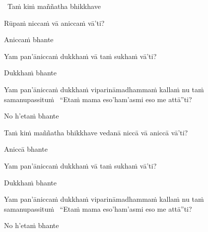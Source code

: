 \begin{pali-leader}
  \anglebracketleft\ \hspace{-0.5mm}Taṁ kiṁ maññatha bhikkhave \hspace{-0.5mm}\anglebracketright\
\end{pali-leader}
\begin{pali-hangtogether}
  Rūpaṁ niccaṁ vā aniccaṁ vā'ti?
\end{pali-hangtogether}
\begin{pali-hangtogether}
  Aniccaṁ bhante
\end{pali-hangtogether}
\begin{pali-hangtogether}
  Yam pan'āniccaṁ dukkhaṁ vā taṁ sukhaṁ vā'ti?
\end{pali-hangtogether}
\begin{pali-hangtogether}
  Dukkhaṁ bhante
\end{pali-hangtogether}
\begin{pali-hangtogether}
  Yam pan'āniccaṁ dukkhaṁ viparināmadhammaṁ kallaṁ nu taṁ samanupassituṁ \breathmark\ ``Etaṁ mama eso'ham'asmi eso me attā''ti?
\end{pali-hangtogether}
\begin{pali-hangtogether}
  No h'etaṁ bhante
\end{pali-hangtogether}

\begin{pali-hang}
  Taṁ kiṁ maññatha bhikkhave vedanā niccā vā aniccā vā'ti?
\end{pali-hang}
\begin{pali-hangtogether}
  Aniccā bhante
\end{pali-hangtogether}
\begin{pali-hangtogether}
  Yam pan'āniccaṁ dukkhaṁ vā taṁ sukhaṁ vā'ti?
\end{pali-hangtogether}
\begin{pali-hangtogether}
  Dukkhaṁ bhante
\end{pali-hangtogether}
\begin{pali-hangtogether}
  Yam pan'āniccaṁ dukkhaṁ viparināmadhammaṁ kallaṁ nu taṁ samanupassituṁ \breathmark\ ``Etaṁ mama eso'ham'asmi eso me attā''ti?
\end{pali-hangtogether}
\begin{pali-hangtogether}
  No h'etaṁ bhante
\end{pali-hangtogether}

